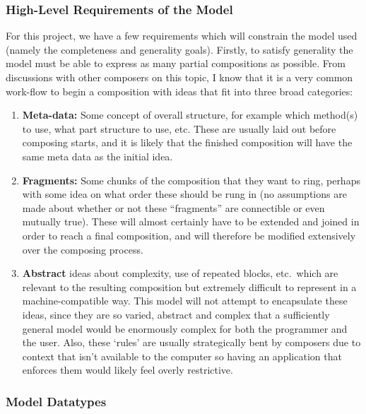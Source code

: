 \documentclass[12pt]{article}
\begin{document}
\subsubsection{High-Level Requirements of the Model}

For this project, we have a few requirements which will constrain the model used (namely the
completeness and generality goals).  Firstly, to satisfy generality the model must be able to
express as many partial compositions as possible.  From discussions with other composers on this
topic, I know that it is a very common work-flow to begin a composition with ideas that fit into
three broad categories:

\begin{enumerate}
    \item \textbf{Meta-data:} Some concept of overall structure, for example which method(s) to use,
        what part structure to use, etc.  These are usually laid out before composing starts, and
        it is likely that the finished composition will have the same meta data as the initial idea.
    \item \textbf{Fragments:} Some chunks of the composition that they want to ring, perhaps with
        some idea on what order these should be rung in (no assumptions are made about whether or
        not these ``fragments'' are connectible or even mutually true).  These will almost certainly
        have to be extended and joined in order to reach a final composition, and will therefore be
        modified extensively over the composing process.
    \item \textbf{Abstract} ideas about complexity, use of repeated blocks, etc.\ which are
        relevant to the resulting composition but extremely difficult to represent in a
        machine-compatible way.  This model will not attempt to encapsulate these ideas, since they
        are so varied, abstract and complex that a sufficiently general model would be enormously
        complex for both the programmer and the user.  Also, these `rules' are usually strategically
        bent by composers due to context that isn't available to the computer so having an
        application that enforces them would likely feel overly restrictive.
\end{enumerate}

\subsubsection{Model Datatypes}
\end{document}
